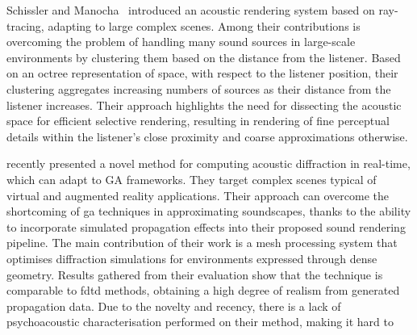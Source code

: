 Schissler and Manocha~\cite{schissler2016interactive} introduced an acoustic rendering system based on ray-tracing, adapting to large complex scenes. Among their contributions is overcoming the problem of handling many sound sources in large-scale environments by clustering them based on the distance from the listener. Based on an octree representation of space, with respect to the listener position, their clustering aggregates increasing numbers of sources as their distance from the listener increases. Their approach highlights the need for dissecting the acoustic space for efficient selective rendering, resulting in rendering of fine perceptual details within the listener's close proximity and coarse approximations otherwise.\par

\cite{schissler2021fast} recently presented a novel method for computing acoustic diffraction in real-time, which can adapt to GA frameworks. They target complex scenes typical of virtual and augmented reality applications. Their approach can overcome the shortcoming of \acrshort{ga} techniques in approximating soundscapes, thanks to the ability to incorporate simulated propagation effects into their proposed sound rendering pipeline. The main contribution of their work is a mesh processing system that optimises diffraction simulations for environments expressed through dense geometry. Results gathered from their evaluation show that the technique is comparable to \acrshort{fdtd} methods, obtaining a high degree of realism from generated propagation data. Due to the novelty and recency, there is a lack of psychoacoustic characterisation performed on their method, making it hard to \par

